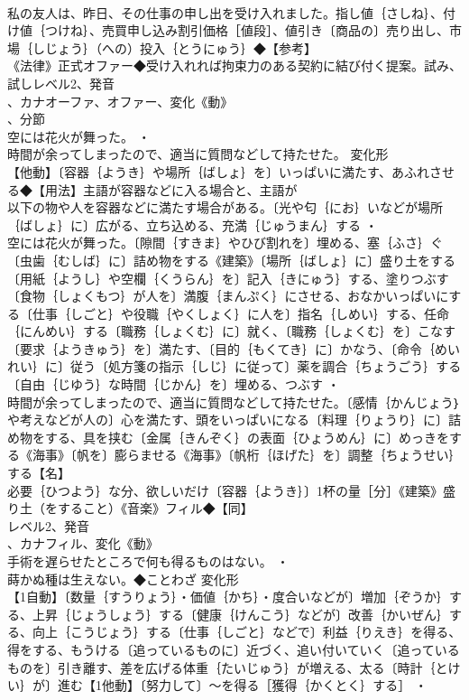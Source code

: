 \documentclass[8pt]{extreport}
\begin{document}
\begin{CJK}{UTF8}{min}
\\	私の友人は、昨日、その仕事の申し出を受け入れました。指し値｛さしね｝、付け値｛つけね｝、売買申し込み割引価格［値段］、値引き〔商品の〕売り出し、市場｛しじょう｝（への）投入｛とうにゅう｝◆【参考】
\\	《法律》正式オファー◆受け入れれば拘束力のある契約に結び付く提案。試み、試しレベル2、発音
\\	、カナオーファ、オファー、変化《動》
\\	、分節
\\	空には花火が舞った。 ・
\\	時間が余ってしまったので、適当に質問などして持たせた。	変化形 
\\	【他動】〔容器｛ようき｝や場所｛ばしょ｝を〕いっぱいに満たす、あふれさせる◆【用法】主語が容器などに入る場合と、主語が
\\	以下の物や人を容器などに満たす場合がある。〔光や匂｛にお｝いなどが場所｛ばしょ｝に〕広がる、立ち込める、充満｛じゅうまん｝する ・
\\	空には花火が舞った。〔隙間｛すきま｝やひび割れを〕埋める、塞｛ふさ｝ぐ〔虫歯｛むしば｝に〕詰め物をする《建築》〔場所｛ばしょ｝に〕盛り土をする〔用紙｛ようし｝や空欄｛くうらん｝を〕記入｛きにゅう｝する、塗りつぶす〔食物｛しょくもつ｝が人を〕満腹｛まんぷく｝にさせる、おなかいっぱいにする〔仕事｛しごと｝や役職｛やくしょく｝に人を〕指名｛しめい｝する、任命｛にんめい｝する〔職務｛しょくむ｝に〕就く、〔職務｛しょくむ｝を〕こなす〔要求｛ようきゅう｝を〕満たす、〔目的｛もくてき｝に〕かなう、〔命令｛めいれい｝に〕従う〔処方箋の指示｛しじ｝に従って〕薬を調合｛ちょうごう｝する〔自由｛じゆう｝な時間｛じかん｝を〕埋める、つぶす ・
\\	時間が余ってしまったので、適当に質問などして持たせた。〔感情｛かんじょう｝や考えなどが人の〕心を満たす、頭をいっぱいになる〔料理｛りょうり｝に〕詰め物をする、具を挟む〔金属｛きんぞく｝の表面｛ひょうめん｝に〕めっきをする《海事》〔帆を〕膨らませる《海事》〔帆桁｛ほげた｝を〕調整｛ちょうせい｝する【名】
\\	必要｛ひつよう｝な分、欲しいだけ〔容器｛ようき｝〕1杯の量［分］《建築》盛り土（をすること）《音楽》フィル◆【同】
\\	レベル2、発音
\\	、カナフィル、変化《動》
\\	手術を遅らせたところで何も得るものはない。 ・
\\	蒔かぬ種は生えない。◆ことわざ	変化形 
\\	【1自動】〔数量｛すうりょう｝・価値｛かち｝・度合いなどが〕増加｛ぞうか｝する、上昇｛じょうしょう｝する〔健康｛けんこう｝などが〕改善｛かいぜん｝する、向上｛こうじょう｝する〔仕事｛しごと｝などで〕利益｛りえき｝を得る、得をする、もうける〔追っているものに〕近づく、追い付いていく〔追っているものを〕引き離す、差を広げる体重｛たいじゅう｝が増える、太る〔時計｛とけい｝が〕進む【1他動】〔努力して〕～を得る［獲得｛かくとく｝する］ ・

\end{CJK}
\end{document}
